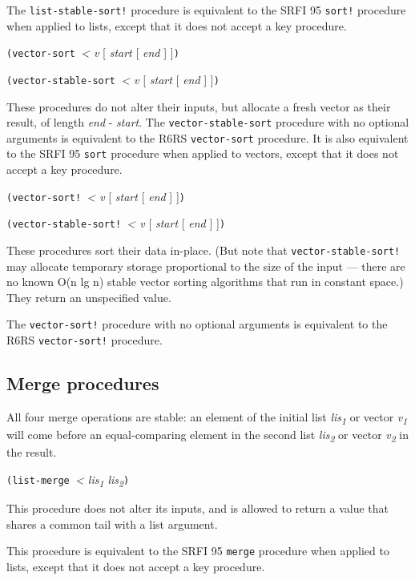 The \texttt{list-stable-sort!} procedure is equivalent to the SRFI 95
\texttt{sort!} procedure when applied to lists, except that it does not
accept a key procedure.

\texttt{(vector-sort\ }\emph{\textless{} v} {[} \emph{start} {[}
\emph{end} {]} {]}\texttt{)}

\texttt{(vector-stable-sort\ }\emph{\textless{} v} {[} \emph{start} {[}
\emph{end} {]} {]}\texttt{)}

These procedures do not alter their inputs, but allocate a fresh vector
as their result, of length \emph{end} - \emph{start}. The
\texttt{vector-stable-sort} procedure with no optional arguments is
equivalent to the R6RS \texttt{vector-sort} procedure. It is also
equivalent to the SRFI 95 \texttt{sort} procedure when applied to
vectors, except that it does not accept a key procedure.

\texttt{(vector-sort!\ }\emph{\textless{} v} {[} \emph{start} {[}
\emph{end} {]} {]}\texttt{)}

\texttt{(vector-stable-sort!\ }\emph{\textless{} v} {[} \emph{start} {[}
\emph{end} {]} {]}\texttt{)}

These procedures sort their data in-place. (But note that
\texttt{vector-stable-sort!} may allocate temporary storage proportional
to the size of the input --- there are no known O(n lg n) stable vector
sorting algorithms that run in constant space.) They return an
unspecified value.

The \texttt{vector-sort!} procedure with no optional arguments is
equivalent to the R6RS \texttt{vector-sort!} procedure.

\subsection{Merge procedures}\label{Mergeprocedures}

All four merge operations are stable: an element of the initial list
\emph{lis\textsubscript{1}} or vector \emph{v\textsubscript{1}} will
come before an equal-comparing element in the second list
\emph{lis\textsubscript{2}} or vector \emph{v\textsubscript{2}} in the
result.

\texttt{(list-merge\ }\emph{\textless{} lis\textsubscript{1}
lis\textsubscript{2}}\texttt{)}

This procedure does not alter its inputs, and is allowed to return a
value that shares a common tail with a list argument.

This procedure is equivalent to the SRFI 95 \texttt{merge} procedure
when applied to lists, except that it does not accept a key procedure.

